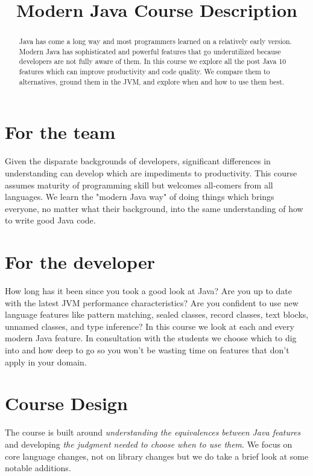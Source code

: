 \documentclass[twoside=false,DIV=14]{scrartcl}
\date{\vspace{-5em}}
\title{\color{blackish} \vspace{-1em} Modern Java Course Description}
\begin{document}
{\color{blackish}\maketitle}\vspace{-1em}

\begin{abstract}
    Java has come a long way and most programmers learned on a relatively early version.  Modern Java has sophisticated and powerful features that go underutilized because developers are not fully aware of them.  In this course we explore all the post Java 10 features which can improve productivity and code quality.  We compare them to alternatives, ground them in the JVM, and explore when and how to use them best. 
\end{abstract}

\section{For the team}
Given the disparate backgrounds of developers, significant differences in understanding can develop which are impediments to productivity.  This course assumes maturity of programming skill but welcomes all-comers from all languages.  We learn the "modern Java way" of doing things which brings everyone, no matter what their background, into the same understanding of how to write good Java code.

\section{For the developer}
How long has it been since you took a good look at Java?  Are you up to date with the latest JVM performance characteristics?  Are you confident to use new language features like pattern matching, sealed classes, record classes, text blocks, unnamed classes, and type inference?  In this course we look at each and every modern Java feature. In consultation with the students we choose which to dig into and how deep to go so you won't be wasting time on features that don't apply in your domain.

\section{Course Design}

The course is built around \emph{understanding the equivalences between Java features} and developing \emph{the judgment needed to choose when to use them}.  We focus on core language changes, not on library changes but we do take a brief look at some notable additions.
\end{document}

